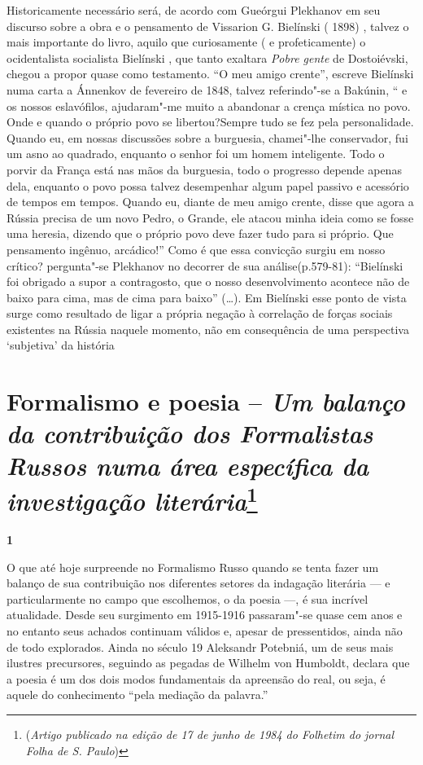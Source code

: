 Historicamente necessário será, de acordo com Gueórgui Plekhanov em seu
discurso sobre a obra e o pensamento de Vissarion G. Bielínski ( 1898) ,
talvez o mais importante do livro, aquilo que curiosamente ( e
profeticamente) o ocidentalista socialista Bielínski , que tanto
exaltara \emph{Pobre gente} de Dostoiévski, chegou a propor quase como
testamento. ``O meu amigo crente'', escreve Bielínski numa carta a
Ánnenkov de fevereiro de 1848, talvez referindo"-se a Bakúnin, `` e os
nossos eslavófilos, ajudaram"-me muito a abandonar a crença mística no
povo. Onde e quando o próprio povo se libertou?Sempre tudo se fez pela
personalidade. Quando eu, em nossas discussões sobre a burguesia,
chamei"-lhe conservador, fui um asno ao quadrado, enquanto o senhor foi
um homem inteligente. Todo o porvir da França está nas mãos da
burguesia, todo o progresso depende apenas dela, enquanto o povo possa
talvez desempenhar algum papel passivo e acessório de tempos em tempos.
Quando eu, diante de meu amigo crente, disse que agora a Rússia precisa
de um novo Pedro, o Grande, ele atacou minha ideia como se fosse uma
heresia, dizendo que o próprio povo deve fazer tudo para si próprio. Que
pensamento ingênuo, arcádico!'' Como é que essa convicção surgiu em
nosso crítico? pergunta"-se Plekhanov no decorrer de sua
análise(p.579-81): ``Bielínski foi obrigado a supor a contragosto, que o
nosso desenvolvimento acontece não de baixo para cima, mas de cima para
baixo'' (\ldots{}). Em Bielínski esse ponto de vista surge como resultado de
ligar a própria negação à correlação de forças sociais existentes na
Rússia naquele momento, não em consequência de uma perspectiva
`subjetiva' da história

\chapter{Formalismo e poesia -- \emph{Um balanço da contribuição dos Formalistas Russos numa
área específica da investigação literária}\footnote{(\emph{Artigo
  publicado na edição de 17 de junho de 1984 do Folhetim do jornal Folha
  de S. Paulo})}}

\textbf{1}

O que até hoje surpreende no Formalismo Russo quando se tenta fazer um
balanço de sua contribuição nos diferentes setores da indagação
literária --- e particularmente no campo que escolhemos, o da poesia ---,
é sua incrível atualidade. Desde seu surgimento em 1915-1916 passaram"-se
quase cem anos e no entanto seus achados continuam válidos e, apesar de
pressentidos, ainda não de todo explorados. Ainda no século 19 Aleksandr
Potebniá, um de seus mais ilustres precursores, seguindo as pegadas de
Wilhelm von Humboldt, declara que a poesia é um dos dois modos
fundamentais da apreensão do real, ou seja, é aquele do conhecimento
``pela mediação da palavra.''

